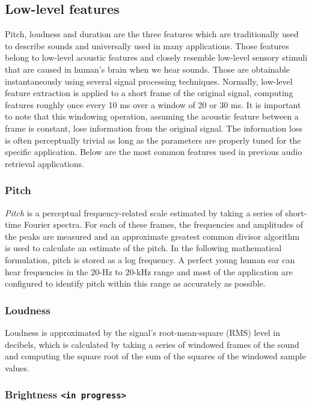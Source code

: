 \subsection{Low-level features}
Pitch, loudness and duration are the three features which are traditionally used to describe sounds and universally used in many applications. Those features belong to low-level acoustic features and closely resemble low-level sensory stimuli that are caused in human's brain when we hear sounds. Those are obtainable instantaneously using several signal processing techniques. Normally, low-level feature extraction is applied to a short frame of the original signal, computing features roughly once every 10 ms over a window of 20 or 30 ms. It is important to note that this windowing operation, assuming the acoustic feature between a frame is constant, lose information from the original signal. The information loss is often perceptually trivial as long as the parameters are properly tuned for the specific application. Below are the most common features used in previous audio retrieval applications.

\subsubsection{Pitch}
\textit{Pitch} is a perceptual frequency-related scale estimated by taking a series of short-time Fourier spectra. For each of these frames, the frequencies and amplitudes of the peaks are measured and an approximate greatest common divisor algorithm is used to calculate an estimate of the pitch. In the following mathematical formulation, pitch is stored as a log frequency. A perfect young human ear can hear frequencies in the 20-Hz to 20-kHz range and most of the application are configured to identify pitch within this range as accurately as possible.

\subsubsection{Loudness}
Loudness is approximated by the signal's root-mean-square (RMS) level in decibels, which is calculated by taking a series of windowed frames of the sound and computing the square root of the sum of the squares of the windowed sample values.

\subsubsection{Brightness \texttt{<in progress>}}

